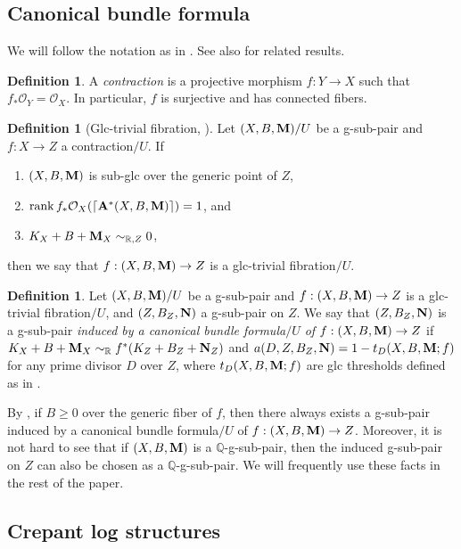 \documentclass[11pt]{amsart}
\numberwithin{equation}{section}
\newcommand{\Mm}{{\bf{M}}}
\newcommand{\NN}{{\bf{N}}}
\newcommand{\Qq}{\mathbb{Q}}
\newcommand{\Rr}{\mathbb{R}}
\newcommand{\rk}{\operatorname{rank}}
\newcommand{\Aa}{{\bf{A}}}
\theoremstyle{definition}
\newtheorem{defn}[thm]{Definition}
\theoremstyle{definition}
\theoremstyle{definition}
\begin{document}
\subsection{Canonical bundle formula}

We will follow the notation as in \cite{JLX22}. See also \cite{Fil20,FS20,HL21b} for related results.


\begin{defn}\label{defn contraction}
A \emph{contraction} is a projective morphism $f: Y\rightarrow X$ such that $f_*\mathcal{O}_Y=\mathcal{O}_X$. In particular, $f$ is surjective and has connected fibers.
\end{defn}

\begin{defn}[Glc-trivial fibration, {\cite[Definition 2.10]{JLX22}}]
Let $(X,B,\Mm)/U$ be a g-sub-pair and $f: X\rightarrow Z$ a contraction$/U$. If
\begin{enumerate}
    \item $(X,B,\Mm)$ is sub-glc over the generic point of $Z$,
    \item $\rk f_*\mathcal{O}_X(\lceil\Aa^*(X,B,\Mm)\rceil)=1$, and
    \item $K_X+B+\Mm_X\sim_{\Rr,Z}0$,
\end{enumerate}
then we say that $f: (X,B,\Mm)\rightarrow Z$ is a glc-trivial fibration$/U$. 
\end{defn}

\begin{defn}
Let $(X,B,\Mm)/U$ be a g-sub-pair and $f: (X,B,\Mm)\rightarrow Z$ is a glc-trivial fibration$/U$, and $(Z,B_Z,\NN)$ a g-sub-pair on $Z$. We say that $(Z,B_Z,\NN)$ is a g-sub-pair \emph{induced by a canonical bundle formula$/U$ of} $f: (X,B,\Mm)\rightarrow Z$ if $K_X+B+\Mm_X\sim_{\mathbb R}f^*(K_Z+B_Z+\NN_Z)$ and $a(D,Z,B_Z,\NN)=1-t_D(X,B,\Mm;f)$ for any prime divisor $D$ over $Z$, where $t_D(X,B,\Mm;f)$ are glc thresholds defined as in \cite[Definition 2.12]{JLX22}. 

By \cite[Theorem 2.23]{JLX22}, if $B\geq 0$ over the generic fiber of $f$, then there always exists a g-sub-pair induced by a canonical bundle formula$/U$ of $f: (X,B,\Mm)\rightarrow Z$. Moreover, it is not hard to see that if $(X,B,\Mm)$ is a $\Qq$-g-sub-pair, then the induced g-sub-pair on $Z$ can also be chosen as a $\Qq$-g-sub-pair. We will frequently use these facts in the rest of the paper.
\end{defn}




\subsection{Crepant log structures}
\end{document}
